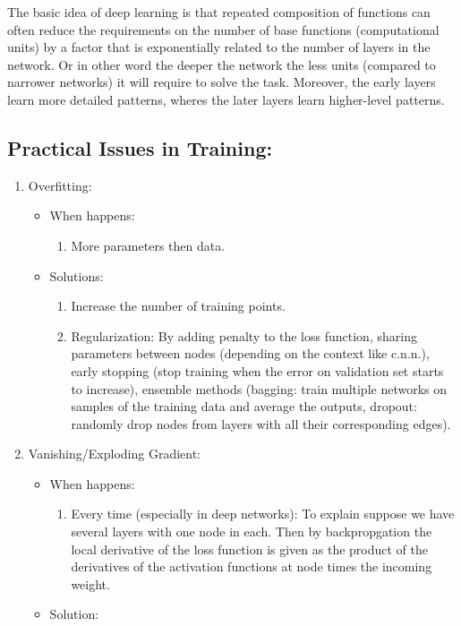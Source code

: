 \documentclass{article}
\begin{document}
The basic idea of deep learning is that repeated composition of functions can often reduce  the requirements on the number of base functions (computational units) by a factor that  is exponentially related to the number of layers in the network. Or in other word the deeper the network the less units (compared to narrower networks) it will require to solve the task. Moreover, the early layers learn more detailed patterns, wheres the later layers learn higher-level patterns.

\subsection{Practical Issues in Training:}
\begin{enumerate}
\item  Overfitting:
\begin{itemize}
\item When happens:
\begin{enumerate}
\item More parameters then data.
\end{enumerate}
\item Solutions:
\begin{enumerate}
\item Increase the number of training points.
\item Regularization: By adding penalty to the loss function, sharing parameters between nodes (depending on the context like c.n.n.), early stopping (stop training when the error on validation set starts to increase), ensemble methods (bagging: train multiple networks on samples of the training data and average the outputs, dropout: randomly drop nodes from layers with all their corresponding edges).
\end{enumerate}
\end{itemize}
\item Vanishing/Exploding Gradient:
\begin{itemize}
\item  When happens:
\begin{enumerate}
\item Every time (especially in deep networks): To explain suppose we have several layers with one node in each. Then by backpropgation the local derivative of the loss function is given as the product of the derivatives of the activation functions at node times the incoming weight.
\end{enumerate}
\item Solution:
\begin{enumerate}

\end{enumerate}
\end{itemize}
\end{enumerate}
\end{document}
